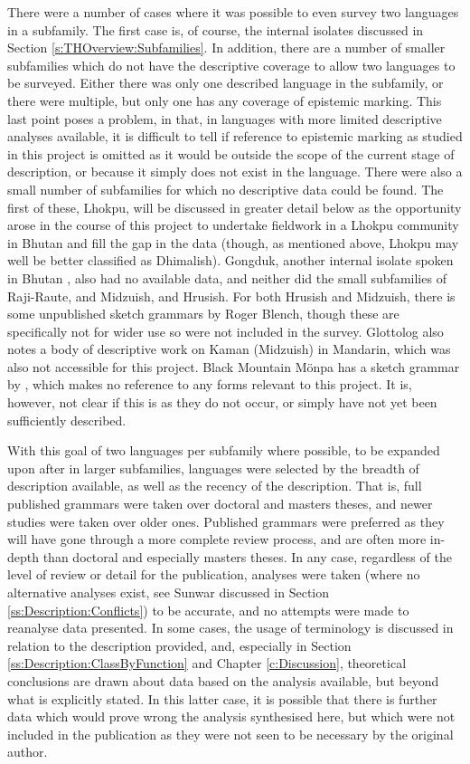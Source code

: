 There were a number of cases where it was possible to even survey two languages in a subfamily. The first case is, of course, the internal isolates discussed in Section \ref{s:THOverview:Subfamilies}. In addition, there are a number of smaller subfamilies which do not have the descriptive coverage to allow two languages to be surveyed. Either there was only one described language in the subfamily, or there were multiple, but only one has any coverage of epistemic marking. This last point poses a problem, in that, in languages with more limited descriptive analyses available, it is difficult to tell if reference to epistemic marking as studied in this project is omitted as it would be outside the scope of the current stage of description, or because it simply does not exist in the language. There were also a small number of subfamilies for which no descriptive data could be found. The first of these, Lhokpu, will be discussed in greater detail below as the opportunity arose in the course of this project to undertake fieldwork in a Lhokpu community in Bhutan and fill the gap in the data (though, as mentioned above, Lhokpu may well be better classified as Dhimalish). Gongduk, another internal isolate spoken in Bhutan \cite{VanDriem2001b}, also had no available data, and neither did the small subfamilies of Raji-Raute, and Midzuish, and Hrusish. For both Hrusish and Midzuish, there is some unpublished sketch grammars by Roger Blench, though these are specifically not for wider use so were not included in the survey. Glottolog also notes a body of descriptive work on Kaman (Midzuish) in Mandarin, which was also not accessible for this project. Black Mountain Mönpa has a sketch grammar by , which makes no reference to any forms relevant to this project. It is, however, not clear if this is as they do not occur, or simply have not yet been sufficiently described.

With this goal of two languages per subfamily where possible, to be expanded upon after in larger subfamilies, languages were selected by the breadth of description available, as well as the recency of the description. That is, full published grammars were taken over doctoral and masters theses, and newer studies were taken over older ones. Published grammars were preferred as they will have gone through a more complete review process, and are often more in-depth than doctoral and especially masters theses. In any case, regardless of the level of review or detail for the publication, analyses were taken (where no alternative analyses exist, see Sunwar discussed in Section \ref{ss:Description:Conflicts}) to be accurate, and no attempts were made to reanalyse data presented. In some cases, the usage of terminology is discussed in relation to the description provided, and, especially in Section \ref{ss:Description:ClassByFunction} and Chapter \ref{c:Discussion}, theoretical conclusions are drawn about data based on the analysis available, but beyond what is explicitly stated. In this latter case, it is possible that there is further data which would prove wrong the analysis synthesised here, but which were not included in the publication as they were not seen to be necessary by the original author.

